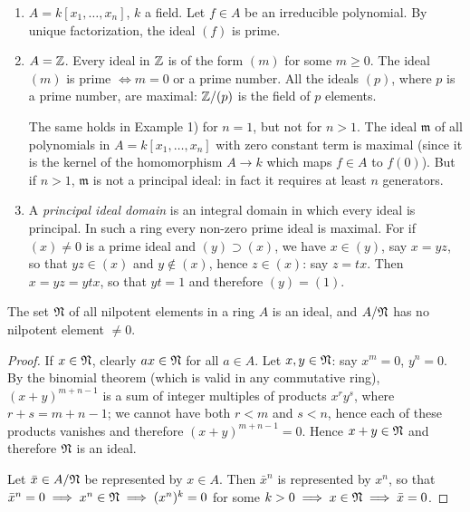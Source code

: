 \begin{examples}
    \begin{enumerate}[1)]
        \item $A = k[x_1, \ldots, x_n]$, $k$ a field. Let $f \in A$ be an irreducible polynomial. By unique factorization, the ideal $(f)$ is prime.
        \item $A = \mathbb{Z}$. Every ideal in $\mathbb{Z}$ is of the form $(m)$ for some $m \geq 0$. The ideal $(m)$ is prime $\iff m = 0$ or a prime number. All the ideals $(p)$, where $p$ is a prime number, are maximal: $\mathbb{Z}/(p)$ is the field of $p$ elements.
        
        The same holds in Example 1) for $n = 1$, but not for $n > 1$. The ideal $\mathfrak{m}$ of all polynomials in $A = k[x_1, \ldots, x_n]$ with zero constant term is maximal (since it is the kernel of the homomorphism $A \to k$ which maps $f \in A$ to $f(0)$). But if $n > 1$, $\mathfrak{m}$ is not a principal ideal: in fact it requires at least $n$ generators.
        \item \label{ex:principal-ideal-domain}A \emph{principal ideal domain} is an integral domain in which every ideal is principal. In such a ring every non-zero prime ideal is maximal. For if $(x) \neq 0$ is a prime ideal and $(y) \supset (x)$, we have $x \in (y)$, say $x = yz$, so that $yz \in (x)$ and $y \notin (x)$, hence $z \in (x)$: say $z = tx$. Then $x = yz = ytx$, so that $yt = 1$ and therefore $(y) = (1)$.
    \end{enumerate}
\end{examples}



\begin{proposition}\label{prop:nilradical-ideal}
The set $\mathfrak{N}$ of all nilpotent elements in a ring $A$ is an ideal, and $A/\mathfrak{N}$ has no nilpotent element $\neq 0$.
\end{proposition}

\begin{proof}
If $x \in \mathfrak{N}$, clearly $ax \in \mathfrak{N}$ for all $a \in A$. Let $x, y \in \mathfrak{N}$: say $x^m = 0$, $y^n = 0$. By the binomial theorem (which is valid in any commutative ring), $(x + y)^{m+n-1}$ is a sum of integer multiples of products $x^r y^s$, where $r + s = m + n - 1$; we cannot have both $r < m$ and $s < n$, hence each of these products vanishes and therefore $(x + y)^{m+n-1} = 0$. Hence $x + y \in \mathfrak{N}$ and therefore $\mathfrak{N}$ is an ideal.

Let $\bar{x} \in A/\mathfrak{N}$ be represented by $x \in A$. Then $\bar{x}^n$ is represented by $x^n$, so that $\bar{x}^n = 0 \implies x^n \in \mathfrak{N} \implies (x^n)^k = 0$ for some $k > 0 \implies x \in \mathfrak{N} \implies \bar{x} = 0$.
\end{proof}


